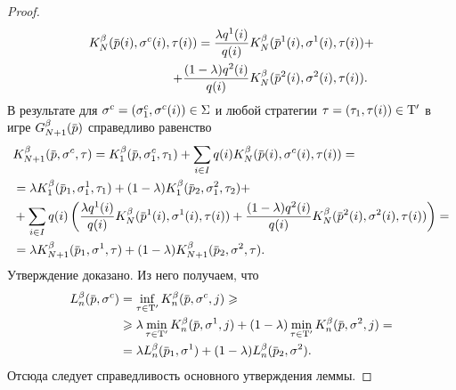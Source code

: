 {\begin{proof}
\begin{equation*}
    \begin{aligned}
      \K{N}(\pad{i}, \sigmaran{c}{i}, \taura{i})
      = \frac{\lambda \qcn{1}{i}}{\qc{i}} &\K{N}(\padn{1}{i}, \sigmaran{1}{i}, \taura{i}) + \\
      + \frac{(1-\lambda) \qcn{2}{i}}{\qc{i}} &\K{N}(\padn{2}{i}, \sigmaran{2}{i}, \taura{i}).
    \end{aligned}
  \end{equation*}
  В результате для $\sigmar^c = (\sigmas[c]{1}, \sigmaran{c}{i}) \in \Sigma$ и любой стратегии $\tau = (\tau_{1}, \tau(i)) \in \mathrm{T}'$ в игре $\theG{N+1}(\pd)$ справедливо равенство
  \begin{align*}
    &\K{N+1}(\pd, \sigmar^c, \taur) =
    \K{1}(\pd, \sigmas[c]{1}, \taus{1}) +
    \sum_{i \in I} \qc{i} \K{N}(\pad{i}, \sigmaran{c}{i}, \taura{i}) =                             \\
    &= \lambda \K{1}(\pd_1, \sigmas[1]{1}, \taus{1}) +
    (1-\lambda) \K{1}(\pd_2, \sigmas[2]{1}, \taus{2}) +                                          \\
    &+ \sum_{i \in I} \qc{i} \left(
      \frac{\lambda \qcn{1}{i}}{\qc{i}} \K{N}(\padn{1}{i}, \sigmaran{1}{i}, \taura{i}) +
      \frac{(1-\lambda) \qcn{2}{i}}{\qc{i}} \K{N}(\padn{2}{i}, \sigmaran{2}{i}, \taura{i})
    \right) =                                                                          \\
    &= \lambda \K{N+1}(\pd_1, \sigmar^1, \taur) +
    (1-\lambda)\K{N+1}(\pd_2, \sigmar^2, \taur).
  \end{align*}
  Утверждение доказано.
  Из него получаем, что
  \begin{align*}
    \L{n}(\pd, \sigmar^c)
    &= \inf_{\taur \in \Tau'} \K{n}(\pd, \sigmar^c, j) \geqslant\\
    &\geqslant \lambda \min_{\taur \in \Tau'} \K{n}(\pd, \sigmar^1, j)
      + (1-\lambda) \min_{\taur \in \Tau'} \K{n}(\pd, \sigmar^2, j) =\\
    &= \lambda \L{n}(\pd_1, \sigmar^1) + (1-\lambda) \L{n}(\pd_2, \sigmar^2).
  \end{align*}
  Отсюда следует справедливость основного утверждения леммы.
\end{proof}

}
